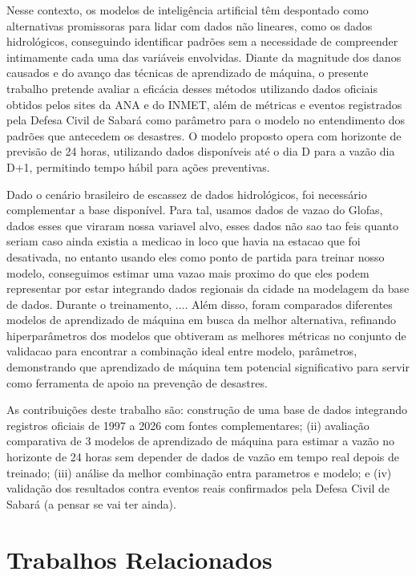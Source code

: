 \documentclass[12pt]{article}
\begin{document}
Nesse contexto, os modelos de inteligência artificial têm despontado como alternativas promissoras para lidar com dados não lineares, como os dados hidrológicos, conseguindo identificar padrões sem a necessidade de compreender intimamente cada uma das variáveis envolvidas. Diante da magnitude dos danos causados e do avanço das técnicas de aprendizado de máquina, o presente trabalho pretende avaliar a eficácia desses métodos utilizando dados oficiais obtidos pelos sites da ANA e do INMET, além de métricas e eventos registrados pela Defesa Civil de Sabará como parâmetro para o modelo no entendimento dos padrões que antecedem os desastres. O modelo proposto opera com horizonte de previsão de 24 horas, utilizando dados disponíveis até o dia D para a vazão dia D+1, permitindo tempo hábil para ações preventivas.

Dado o cenário brasileiro de escassez de dados hidrológicos, foi necessário complementar a base disponível. Para tal, usamos dados de vazao do Glofas, dados esses que viraram nossa variavel alvo, esses dados não sao tao feis quanto seriam caso ainda existia a medicao in loco que havia na estacao que foi desativada, no entanto usando eles como ponto de partida para treinar nosso modelo, conseguimos estimar uma vazao mais proximo do que eles podem representar por estar integrando dados regionais da cidade na modelagem da base de dados. Durante o treinamento, .... Além disso, foram comparados diferentes modelos de aprendizado de máquina em busca da melhor alternativa, refinando hiperparâmetros dos modelos que obtiveram as melhores métricas no conjunto de validacao para encontrar a combinação ideal entre modelo, parâmetros, demonstrando que aprendizado de máquina tem potencial significativo para servir como ferramenta de apoio na prevenção de desastres.

As contribuições deste trabalho são: construção de uma base de dados integrando registros oficiais de 1997 a 2026 com fontes complementares; (ii) avaliação comparativa de 3 modelos de aprendizado de máquina para estimar a vazão no horizonte de 24 horas sem depender de dados de vazão em tempo real depois de treinado; (iii) análise da melhor combinação entra parametros e modelo; e (iv) validação dos resultados contra eventos reais confirmados pela Defesa Civil de Sabará (a pensar se vai ter ainda).

\section{Trabalhos Relacionados}
\end{document}
